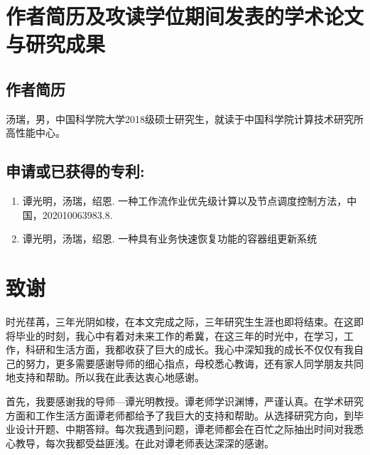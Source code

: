 \chapter{作者简历及攻读学位期间发表的学术论文与研究成果}

\section*{作者简历}

汤瑞，男，中国科学院大学2018级硕士研究生，就读于中国科学院计算技术研究所高性能中心。

\section*{申请或已获得的专利:}

\begin{enumerate}
    \item 谭光明，汤瑞，绍恩. ⼀种⼯作流作业优先级计算以及节点调度控制⽅法，中国，202010063983.8.
    \item 谭光明，汤瑞，绍恩. ⼀种具有业务快速恢复功能的容器组更新系统
\end{enumerate}

\chapter[致谢]{致\quad 谢}%
\thispagestyle{noheaderstyle}%

时光荏苒，三年光阴如梭，在本文完成之际，三年研究生生涯也即将结束。在这即将毕业的时刻，我心中有着对未来工作的希冀，在这三年的时光中，在学习，工作，科研和生活方面，我都收获了巨大的成长。我心中深知我的成长不仅仅有我自己的努力，更多需要感谢导师的细心指点，母校悉心教诲，还有家人同学朋友共同地支持和帮助。所以我在此表达衷心地感谢。

首先，我要感谢我的导师—谭光明教授。谭老师学识渊博，严谨认真。在学术研究方面和工作生活方面谭老师都给予了我巨大的支持和帮助。从选择研究方向，到毕业设计开题、中期答辩。每次我遇到问题，谭老师都会在百忙之际抽出时间对我悉心教导，每次我都受益匪浅。在此对谭老师表达深深的感谢。

